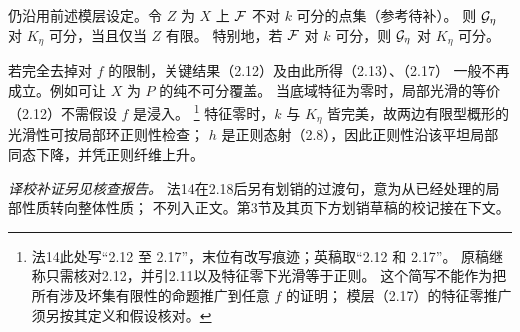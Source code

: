 仍沿用前述模层设定。令 $Z$ 为 $X$ 上 $\mathcal F$ 不对 $k$ 可分的点集（参考待补）。
则 $\mathcal G_\eta$ 对 $K_\eta$ 可分，当且仅当 $Z$ 有限。
特别地，若 $\mathcal F$ 对 $k$ 可分，则 $\mathcal G_\eta$ 对 $K_\eta$ 可分。

若完全去掉对 $f$ 的限制，关键结果（2.12）及由此所得（2.13）、（2.17）
一般不再成立。例如可让 $X$ 为 $P$ 的纯不可分覆盖。
当底域特征为零时，局部光滑的等价（2.12）不需假设 $f$ 是浸入。
\footnote{法14此处写“2.12 至 2.17”，末位有改写痕迹；英稿取“2.12 和 2.17”。
原稿继称只需核对2.12，并引2.11以及特征零下光滑等于正则。
这个简写不能作为把所有涉及坏集有限性的命题推广到任意 $f$ 的证明；
模层（2.17）的特征零推广须另按其定义和假设核对。}
特征零时，$k$ 与 $K_\eta$ 皆完美，故两边有限型概形的光滑性可按局部环正则性检查；
$h$ 是正则态射（2.8），因此正则性沿该平坦局部同态下降，并凭正则纤维上升。

\par\noindent\textit{译校补证另见核查报告。}
\noindent 法14在2.18后另有划销的过渡句，意为从已经处理的局部性质转向整体性质；
不列入正文。第3节及其页下方划销草稿的校记接在下文。

\endgroup
